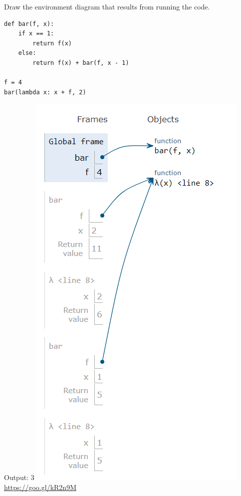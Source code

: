 \begin{blocksection}
\question Draw the environment diagram that results from running the code.

\begin{lstlisting}
def bar(f, x):
    if x == 1:
        return f(x)
    else:
        return f(x) + bar(f, x - 1)

f = 4
bar(lambda x: x + f, 2)
\end{lstlisting}

\begin{solution}[0.3in]
Output: 3 \newline
\includegraphics[scale=0.5]{foobar1_new.png}
\newline
\url{https://goo.gl/kR2n9M}
\end{solution}
\end{blocksection}

